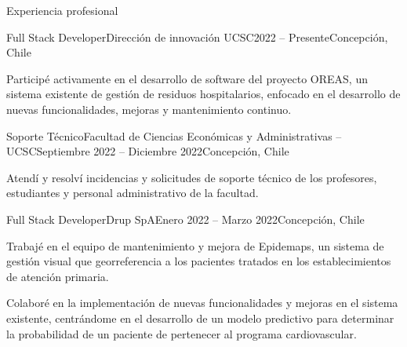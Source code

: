 \begin{section}{Experiencia profesional}

    \begin{subsection}{Full Stack Developer}{Dirección de innovación UCSC}{2022 -- Presente}{Concepción, Chile}
    {
    \item Participé activamente en el desarrollo de software del proyecto OREAS, un sistema existente de gestión de residuos hospitalarios, enfocado en el desarrollo de nuevas funcionalidades, mejoras y mantenimiento continuo.
    }
    \end{subsection}
    
    \begin{subsection}{Soporte Técnico}{Facultad de Ciencias Económicas y Administrativas – UCSC}{Septiembre 2022 -- Diciembre 2022}{Concepción, Chile}
    {
    \item Atendí y resolví incidencias y solicitudes de soporte técnico de los profesores, estudiantes y personal administrativo de la facultad.
    }  
    \end{subsection}
    
    \begin{subsection}{Full Stack Developer}{Drup SpA}{Enero 2022 -- Marzo 2022}{Concepción, Chile}
    {
    \item Trabajé en el equipo de mantenimiento y mejora de Epidemaps, un sistema de gestión visual que georreferencia a los pacientes tratados en los establecimientos de atención primaria.
    \item Colaboré en la implementación de nuevas funcionalidades y mejoras en el sistema existente, centrándome en el desarrollo de un modelo predictivo para determinar la probabilidad de un paciente de pertenecer al programa cardiovascular.
    } 
    \end{subsection}
    
\end{section}